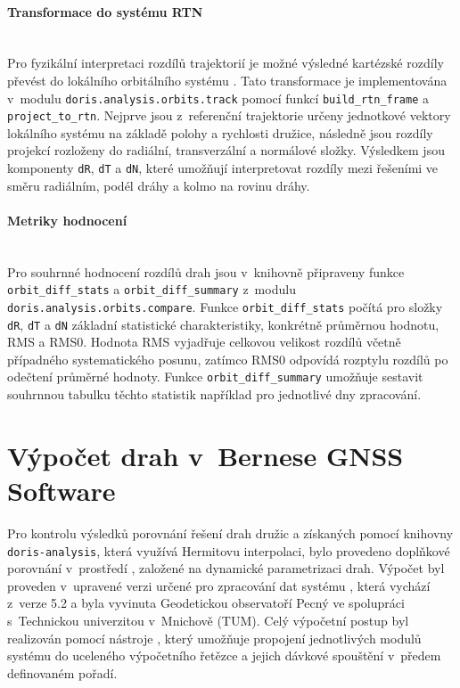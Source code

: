 \paragraph{Transformace do systému RTN}\leavevmode\\
Pro fyzikální interpretaci rozdílů trajektorií je možné výsledné kartézské rozdíly převést do lokálního orbitálního systému . Tato transformace je implementována v~modulu \texttt{doris.analysis.orbits.track} pomocí funkcí \texttt{build\_rtn\_frame} a \texttt{project\_to\_rtn}. Nejprve jsou z~referenční trajektorie určeny jednotkové vektory lokálního systému na základě polohy a rychlosti družice, následně jsou rozdíly projekcí rozloženy do radiální, transverzální a normálové složky. Výsledkem jsou komponenty \texttt{dR}, \texttt{dT} a \texttt{dN}, které umožňují interpretovat rozdíly mezi řešeními ve směru radiálním, podél dráhy a kolmo na rovinu dráhy.

\paragraph{Metriky hodnocení}\leavevmode\\
Pro souhrnné hodnocení rozdílů drah jsou v~knihovně připraveny funkce \texttt{orbit\_diff\_stats} a \texttt{orbit\_diff\_summary} z~modulu \texttt{doris.analysis.orbits.compare}. Funkce \texttt{orbit\_diff\_stats} počítá pro složky \texttt{dR}, \texttt{dT} a \texttt{dN} základní statistické charakteristiky, konkrétně průměrnou hodnotu, RMS a RMS0. Hodnota RMS vyjadřuje celkovou velikost rozdílů včetně případného systematického posunu, zatímco RMS0 odpovídá rozptylu rozdílů po odečtení průměrné hodnoty. Funkce \texttt{orbit\_diff\_summary} umožňuje sestavit souhrnnou tabulku těchto statistik například pro jednotlivé dny zpracování.

\section{Výpočet drah v~Bernese GNSS Software}

Pro kontrolu výsledků porovnání řešení drah družic  a  získaných pomocí knihovny \texttt{doris-analysis}, která využívá Hermitovu interpolaci, bylo provedeno doplňkové porovnání v~prostředí , založené na dynamické parametrizaci drah. Výpočet byl proveden v~upravené verzi  určené pro zpracování dat systému , která vychází z~verze 5.2 a byla vyvinuta Geodetickou observatoří Pecný ve spolupráci s~Technickou univerzitou v~Mnichově (TUM). Celý výpočetní postup byl realizován pomocí nástroje , který umožňuje propojení jednotlivých modulů systému  do uceleného výpočetního řetězce a jejich dávkové spouštění v~předem definovaném pořadí.

